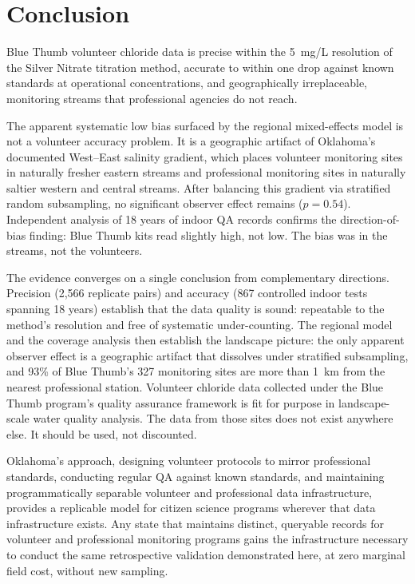 \documentclass[lineno]{wlpeerj}
\begin{document}
\section{Conclusion}

Blue Thumb volunteer chloride data is precise within the 5~mg/L resolution of the Silver Nitrate titration method, accurate to within one drop against known standards at operational concentrations, and geographically irreplaceable, monitoring streams that professional agencies do not reach.

The apparent systematic low bias surfaced by the regional mixed-effects model is not a volunteer accuracy problem. It is a geographic artifact of Oklahoma's documented West--East salinity gradient, which places volunteer monitoring sites in naturally fresher eastern streams and professional monitoring sites in naturally saltier western and central streams. After balancing this gradient via stratified random subsampling, no significant observer effect remains ($p = 0.54$). Independent analysis of 18 years of indoor QA records confirms the direction-of-bias finding: Blue Thumb kits read slightly high, not low. The bias was in the streams, not the volunteers.

The evidence converges on a single conclusion from complementary directions. Precision (2,566 replicate pairs) and accuracy (867 controlled indoor tests spanning 18 years) establish that the data quality is sound: repeatable to the method's resolution and free of systematic under-counting. The regional model and the coverage analysis then establish the landscape picture: the only apparent observer effect is a geographic artifact that dissolves under stratified subsampling, and 93\% of Blue Thumb's 327 monitoring sites are more than 1~km from the nearest professional station. Volunteer chloride data collected under the Blue Thumb program's quality assurance framework is fit for purpose in landscape-scale water quality analysis. The data from those sites does not exist anywhere else. It should be used, not discounted.

Oklahoma's approach, designing volunteer protocols to mirror professional standards, conducting regular QA against known standards, and maintaining programmatically separable volunteer and professional data infrastructure, provides a replicable model for citizen science programs wherever that data infrastructure exists. Any state that maintains distinct, queryable records for volunteer and professional monitoring programs gains the infrastructure necessary to conduct the same retrospective validation demonstrated here, at zero marginal field cost, without new sampling.
\end{document}
